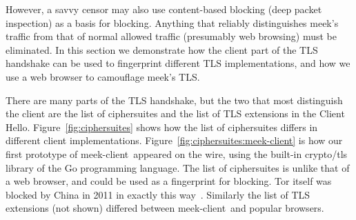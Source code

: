 \documentclass{article}
\def\meekclient{\mbox{meek-client}}
\begin{document}
However, a savvy censor may also use content-based blocking
(deep packet inspection) as a basis for blocking.
Anything that reliably distinguishes meek's traffic from that of normal allowed traffic
(presumably web browsing) must be eliminated.
In this section we demonstrate how the client part of the TLS handshake can be used
to fingerprint different TLS implementations,
and how we use a web browser to camouflage meek's TLS.

There are many parts of the TLS handshake, but the two that
most distinguish the client are the list of ciphersuites and the
list of TLS extensions in the Client Hello.
Figure~\ref{fig:ciphersuites} shows how the list of ciphersuites
differs in different client implementations.
Figure~\ref{fig:ciphersuites:meek-client} is how our first prototype of \meekclient\ appeared on the wire,
using the built-in crypto/tls library of the Go programming language.
The list of ciphersuites is unlike that of a web browser,
and could be used as a fingerprint for blocking.
Tor itself was blocked by China in 2011 in exactly this way~\cite{bug4744}.
Similarly the list of TLS extensions (not shown)
differed between \meekclient\ and popular browsers.
\end{document}
